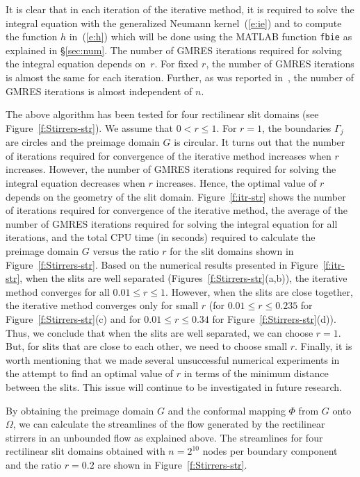 \documentclass[11pt,a4paper]{article}
\begin{document}
It is clear that in each iteration of the iterative method, it is required to solve the integral equation with the generalized Neumann kernel~(\ref{e:ie}) and to compute the function $h$ in~(\ref{e:h}) which will be done using the MATLAB function \verb|fbie| as explained in \S\ref{sec:num}. The number of GMRES iterations required for solving the integral equation depends on~$r$. For fixed $r$, the number of GMRES iterations is almost the same for each iteration. Further, as was reported in~\cite{NAS-ETNA15}, the number of GMRES iterations is almost independent of $n$.

The above algorithm has been tested for four rectilinear slit domains (see Figure~\ref{f:Stirrers-str}). We assume that $0<r\le1$. For $r=1$, the boundaries $\Gamma_j$ are circles and the preimage domain $G$ is circular.  It turns out that the number of iterations required for convergence of the iterative method increases when $r$ increases. However, the number of GMRES iterations required for solving the integral equation decreases when $r$ increases. 
Hence, the optimal value of $r$ depends on the geometry of the slit domain. Figure~\ref{f:itr-str} shows the number of iterations required for convergence of the iterative method, the average of the number of GMRES iterations required for solving the integral equation for all iterations, and the total CPU time (in seconds) required to calculate the preimage domain $G$ versus the ratio $r$ for the slit domains shown in Figure~\ref{f:Stirrers-str}. Based on the numerical results presented in Figure~\ref{f:itr-str}, when the slits are well separated (Figures~\ref{f:Stirrers-str}(a,b)), the iterative method converges for all $0.01\le r\le1$. However, when the slits are close together, the iterative method converges only for small $r$ (for $0.01\le r\le0.235$ for Figure~\ref{f:Stirrers-str}(c) and for $0.01\le r\le0.34$ for Figure~\ref{f:Stirrers-str}(d)). Thus, we conclude that when the slits are well separated, we can choose $r=1$. But, for slits that are close to each other, we need to choose small $r$. Finally, it is worth mentioning that we made several unsuccessful numerical experiments in the attempt to find an optimal value of $r$ in terms of the minimum distance between the slits. This issue will continue to be investigated in future research.

By obtaining the preimage domain $G$ and the conformal mapping $\Phi$ from $G$ onto $\Omega$, we can calculate the streamlines of the flow generated by the rectilinear stirrers in an unbounded flow as explained above. The streamlines for four rectilinear slit domains obtained with $n=2^{10}$ nodes per boundary component and the ratio $r=0.2$ are shown in Figure~\ref{f:Stirrers-str}.
\end{document}

